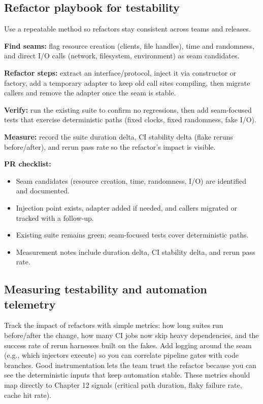 \subsection{Refactor playbook for testability}
Use a repeatable method so refactors stay consistent across teams and releases.

\textbf{Find seams:} flag resource creation (clients, file handles), time and randomness, and direct I/O calls (network, filesystem, environment) as seam candidates.

\textbf{Refactor steps:} extract an interface/protocol, inject it via constructor or factory, add a temporary adapter to keep old call sites compiling, then migrate callers and remove the adapter once the seam is stable.

\textbf{Verify:} run the existing suite to confirm no regressions, then add seam-focused tests that exercise deterministic paths (fixed clocks, fixed randomness, fake I/O).

\textbf{Measure:} record the suite duration delta, CI stability delta (flake reruns before/after), and rerun pass rate so the refactor’s impact is visible.

\textbf{PR checklist:}
\begin{itemize}
  \item Seam candidates (resource creation, time, randomness, I/O) are identified and documented.
  \item Injection point exists, adapter added if needed, and callers migrated or tracked with a follow-up.
  \item Existing suite remains green; seam-focused tests cover deterministic paths.
  \item Measurement notes include duration delta, CI stability delta, and rerun pass rate.
\end{itemize}

\subsection{Measuring testability and automation telemetry}
Track the impact of refactors with simple metrics: how long suites run before/after the change, how many CI jobs now skip heavy dependencies, and the success rate of rerun harnesses built on the fakes. Add logging around the seam (e.g., which injectors execute) so you can correlate pipeline gates with code branches. Good instrumentation lets the team trust the refactor because you can see the deterministic inputs that keep automation stable. These metrics should map directly to Chapter 12 signals (critical path duration, flaky failure rate, cache hit rate).

